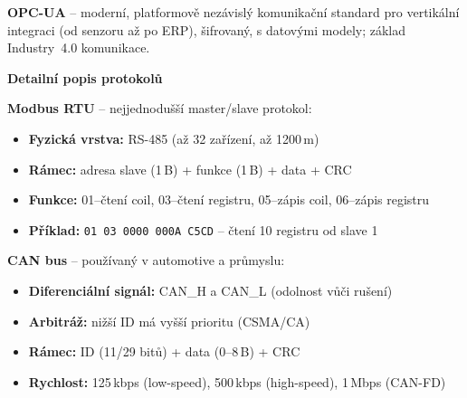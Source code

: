 \documentclass[a4paper,10pt]{article}
\begin{document}
\begin{vysvetlenibox}
\textbf{OPC-UA} -- moderní, platformově nezávislý komunikační standard
pro vertikální integraci (od senzoru až po ERP), šifrovaný, s datovými
modely; základ Industry~4.0 komunikace.

\textbf{Detailní popis protokolů}

\textbf{Modbus RTU} -- nejjednodušší master/slave protokol:
\begin{itemize}[noitemsep, leftmargin=1.4em, topsep=4pt]
    \item \textbf{Fyzická vrstva:} RS-485 (až 32 zařízení, až 1200\,m)
    \item \textbf{Rámec:} adresa slave (1\,B) + funkce (1\,B) + data + CRC
    \item \textbf{Funkce:} 01--čtení coil, 03--čtení registru, 05--zápis coil, 06--zápis registru
    \item \textbf{Příklad:} \texttt{01 03 0000 000A C5CD} -- čtení 10 registru od slave 1
\end{itemize}

\textbf{CAN bus} -- používaný v automotive a průmyslu:
\begin{itemize}[noitemsep, leftmargin=1.4em, topsep=4pt]
    \item \textbf{Diferenciální signál:} CAN\_H a CAN\_L (odolnost vůči rušení)
    \item \textbf{Arbitráž:} nižší ID má vyšší prioritu (CSMA/CA)
    \item \textbf{Rámec:} ID (11/29 bitů) + data (0--8\,B) + CRC
    \item \textbf{Rychlost:} 125\,kbps (low-speed), 500\,kbps (high-speed), 1\,Mbps (CAN-FD)
\end{itemize}

\begin{center}
\end{center}


\end{vysvetlenibox}
\end{document}
